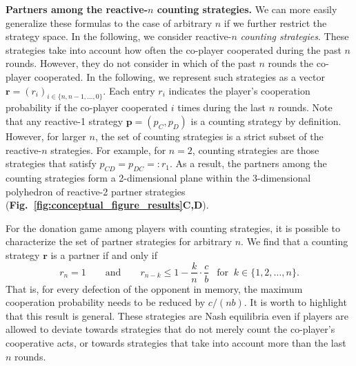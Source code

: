 \documentclass[9pt,twocolumn,twoside]{pnas-new}
\newcommand{\figref}[1]{{\textbf{Fig.~\ref{#1}}}}
\begin{document}
\noindent
\textbf{Partners among the reactive-$n$ counting strategies.}
We can more easily generalize these formulas to the case of arbitrary $n$ if we further restrict the strategy space. 
In the following, we consider reactive-$n$ {\it counting strategies}. 
These strategies take into account how often the co-player cooperated during the past $n$ rounds. 
However, they do not consider in which of the past $n$ rounds the co-player cooperated. 
In the following, we represent such strategies as a vector $\mathbf{r}\!=\!(r_i)_{i \in \{n, n -1, \dots, 0\}}$. 
Each entry \(r_i\) indicates the player's cooperation probability if the co-player cooperated \(i\) times during the last \(n\) rounds. 
Note that any reactive-1 strategy $\mathbf{p}\!=\!(p_{C}, p_{D})$ is a counting strategy by definition. 
However, for larger $n$, the set of counting strategies is a strict subset of the reactive-$n$ strategies.
For example, for $n\!=\!2$, counting strategies are those strategies that satisfy $p_{CD}\!=\!p_{DC}\!=:\!r_1$. 
As a result, the partners among the counting strategies form a 2-dimensional plane within the 3-dimensional polyhedron of reactive-2 partner strategies (\figref{fig:conceptual_figure_results}\textbf{C,D}).

For the donation game among players with counting strategies, it is possible to characterize the set of partner strategies for arbitrary $n$. We find that a counting strategy $\mathbf{r}$ is a partner if and only if
\begin{equation} \label{eq:counting}
r_n = 1 \qquad \text{and} \qquad r_{n - k} \le 1\! -\! \frac{k}{n} \!\cdot\! \frac{c}{b}~~ \text{ for }~k \!\in\! \{1, 2, \dots, n\}.
\end{equation}
That is, for every defection of the opponent in memory, the maximum cooperation probability needs to be reduced by $c/(nb)$.
It is worth to highlight that this result is general. 
These strategies are Nash equilibria even if players are allowed to deviate towards strategies that do not merely count the co-player's cooperative acts, or towards strategies that take into account more than the last $n$ rounds.\\ 
\end{document}
